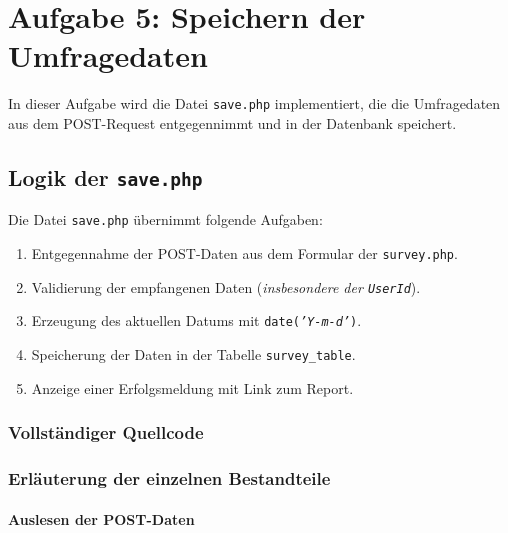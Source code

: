 
\chapter{Aufgabe 5: Speichern der Umfragedaten}
\label{chap:aufgabe5}
\thispagestyle{fancy}

In dieser Aufgabe wird die Datei \texttt{save.php} implementiert, die die Umfragedaten aus dem POST-Request entgegennimmt und in der Datenbank speichert.

\section{Logik der \texttt{save.php}}

Die Datei \texttt{save.php} übernimmt folgende Aufgaben:

\begin{enumerate}
    \item Entgegennahme der POST-Daten aus dem Formular der \texttt{survey.php}.
    \item Validierung der empfangenen Daten (\textit{insbesondere der \texttt{UserId}}).
    \item Erzeugung des aktuellen Datums mit \texttt{date(\textit{'Y-m-d'})}.
    \item Speicherung der Daten in der Tabelle \texttt{survey\_table}.
    \item Anzeige einer Erfolgsmeldung mit Link zum Report.
\end{enumerate}

\subsection{Vollständiger Quellcode}



\subsection{Erläuterung der einzelnen Bestandteile}

\subsubsection{Auslesen der POST-Daten}

